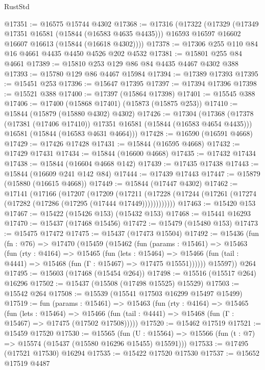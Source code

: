 \begin{lexlean}{RustStd}
\begin{coremodule}
@17351 := @16575 @15744 @4302
@17368 := @17316
    (@17322
      (@17329
        (@17349 @17351 @16581 (@15844 (@16583 @4635 @4435)))
        @16593
        @16597
        @16602
        @16607
        @16613
        (@15844 (@16618 @4302))))
@17378 := @17306 @255 @110 @84 @16 @4661 @4435 @4450 @4526 @202 @4532
@17381 := @15801 @255 @84 @4661
@17389 := @15810 @253 @129 @86 @84 @4435 @4467 @4302 @388
@17393 := @15780 @129 @86 @4467 @15984
@17394 := @17389 @17393
@17395 := @15451 @253
@17396 := @15647 @17395
@17397 := @17394 @17396
@17398 := @15521 @388
@17400 := @17397 (@15864 @17398)
@17401 := @15545 @388
@17406 := @17400 (@15868 @17401) (@15873 (@15875 @253))
@17410 := @15844 (@15879 (@15880 @4302) @4302)
@17426 := @17304
    (@17368
      (@17378 (@17381 (@17406 @17410)) @17351 @16581 (@15844 (@16583 @4654 @4435)))
      @16581
      (@15844 (@16583 @4631 @4664)))
@17428 := @16590 (@16591 @4668)
@17429 := @17426 @17428
@17431 := @15844 (@16595 @4668)
@17432 := @17429 @17431
@17434 := @15844 (@16600 @4668)
@17435 := @17432 @17434
@17438 := @15844 (@16604 @4668 @142)
@17439 := @17435 @17438
@17443 := @15844 (@16609 @241 @142 @84)
@17444 := @17439 @17443
@17447 := @15879 (@15880 (@16615 @4668))
@17449 := @15844 (@17447 @4302)
@17462 := @17141
    (@17166
      (@17207
        (@17209
          (@17211 (@17228 (@17244 (@17261 (@17274 (@17282 (@17286 (@17295 (@17444 @17449))))))))))))
@17463 := @15420 @153
@17467 := @15422 (@15426 @153) (@15432 @153)
@17468 := @15441 @16293
@17470 := @15437 (@17468 @15456)
@17472 := @15479 (@15480 @153)
@17473 := @15475 @17472
@17475 := @15437 (@17473 @15504)
@17492 := @15436
    (fun (fn : @76) =>
    @17470
      (@15459
        (@15462
          (fun (params : @15461) =>
          @15463
            (fun (rty : @4164) =>
            @15465
              (fun (lets : @15464) =>
              @15466 (fun (tail : @4441) => @15468 (fun (Γ : @15467) => @17475 @15551))))))
        @15597))
    @264
@17495 := @15603 (@17468 (@15454 @264))
@17498 := @15516 (@15517 @264) @16296
@17502 := @15437 (@15508 (@17498 @15525) @15529)
@17503 := @15542 @264
@17508 := @15539 (@15541 @17503 @16299 @15497 @15499)
@17519 := fun (params : @15461) =>
  @15463
    (fun (rty : @4164) =>
    @15465
      (fun (lets : @15464) =>
      @15466 (fun (tail : @4441) => @15468 (fun (Γ : @15467) => @17475 (@17502 @17508)))))
@17520 := @15462 @17519
@17521 := @15459 @17520
@17530 := @15565
    (fun (U : @15564) => @15566 (fun (t : @7) => @15574 (@15437 (@15580 @16296 @15455) @15591)))
@17533 := @17495 (@17521 @17530) @16294
@17535 := @15422 @17520 @17530
@17537 := @15652 @17519 @4487

\end{coremodule}
\end{lexlean}
